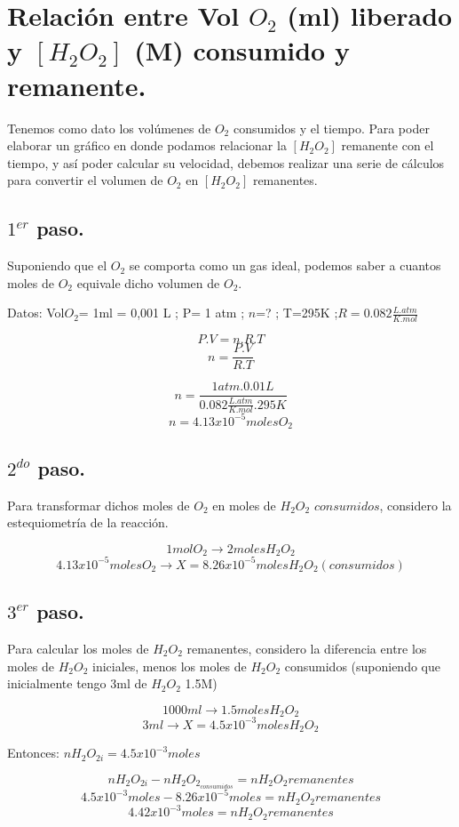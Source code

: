 \documentclass[a4paper,12pt]{article}
\begin{document}
\section{Relación entre Vol $O_2$ (ml) liberado  y $[H_2O_2]$ (M) consumido y remanente.}

   Tenemos como dato los volúmenes de $O_2$ consumidos y el tiempo. Para poder elaborar un gráfico en donde podamos relacionar la $[H_2O_2]$ remanente con el tiempo, y así poder calcular su velocidad, debemos realizar una serie de cálculos para convertir el volumen de $O_2$ en  $[H_2O_2]$ remanentes.
\subsection{ $1^{er}$ paso.} Suponiendo que el $O_2$ se comporta como un gas ideal, podemos saber a cuantos moles de $O_2$ equivale dicho volumen de $O_2$.

  Datos: Vol$O_2$= 1ml = 0,001 L ; P= 1 atm ; $n$=? ; T=295K ;$R=0.082 \frac{L.atm}{K.mol}$
  
  $$P.V=n.R.T$$
$$n=\frac{P.V}{R.T}$$

$$n=\frac{1atm . 0.01L}{0.082 \frac{L.atm}{K.mol}. 295K}$$
$$n=4.13x10^{-5} moles O_2$$

\subsection{ $2^{do}$ paso.} Para transformar dichos moles de $O_2$ en moles de $H_2O_2$ $consumidos$, considero la estequiometría de la reacción.

$$1 mol O_2\to 2 moles H_2O_2$$
$$4.13x10^{-5} moles O_2 \to X=8.26x10^{-5} moles H_2O_2 (consumidos)$$
 
\subsection{ $3^{er}$ paso.}Para calcular los moles de $H_2O_2$ remanentes, considero la diferencia entre los moles de   $H_2O_2$ iniciales, menos los moles de  $H_2O_2$ consumidos (suponiendo que inicialmente tengo 3ml de $H_2O_2$ 1.5M)

$$1000ml \to 1.5 moles H_2O_2$$
$$3ml \to X= 4.5x10^{-3} moles H_2O_2$$

Entonces: $nH_2O_{2i}= 4.5x10^{-3} moles$

$$nH_2O_{2i} - nH_2O_{2_{consumidos}}=nH_2O_2 remanentes$$
$$4.5x10^{-3} moles - 8.26x10^{-5} moles =nH_2O_2 remanentes$$
$$4.42x10^{-3}moles=nH_2O_2 remanentes$$
\end{document}
